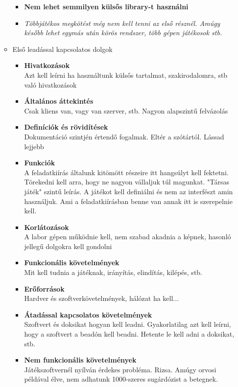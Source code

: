 \documentclass{article}
\begin{document}
\begin{itemize}
\begin{itemize}
\begin{itemize}
				\item \textbf{Nem lehet semmilyen külsős library-t használni}
				\item \textit{Többjátékos megkötést még nem kell tenni az első résznél. Amúgy később lehet egymás után körös rendszer, több gépen játékosok stb.}
			\end{itemize}
			\item Első leadással kapcsolatos dolgok
			\begin{itemize}
				\item \textbf{Hivatkozások}\\
				Azt kell leírni ha használtunk külsős tartalmat, szakirodalomra, stb való hivatkozások
				\item \textbf{Általános áttekintés}\\
				Csak kliens van, vagy van szerver, stb. Nagyon alapszintű felvázolás 
				\item \textbf{Definíciók és rövidítések}\\ 
				Dokumentáció szintjén értendő fogalmak. Eltér a szótártól. Lássad lejjebb
				\item \textbf{Funkciók}\\
				A feladatkiírás általunk kitömött részeire itt hangsúlyt kell fektetni. Törekedni kell arra, hogy ne nagyon vállaljuk túl magunkat. "Társas játék" szintű leírás. A játékot kell definiálni és nem az interfészt amin használjuk. Ami a feladatkiírásban benne van annak itt is szerepelnie kell. 
				\item \textbf{Korlátozások}\\
				A labor gépen működnie kell, nem szabad akadnia a képnek, hasonló jellegű dolgokra kell gondolni
				\item \textbf{Funkcionális követelmények}\\
				Mit kell tudnia a játéknak, irányítás, elindítás, kilépés, stb.
				\item \textbf{Erőforrások}\\
				Hardver és szoftverkövetelmények, hálózat ha kell...
				\item \textbf{Átadással kapcsolatos követelmények}\\
				Szoftvert és doksikat hogyan kell leadni. Gyakorlatilag azt kell leírni, hogy a szoftvert a beadón kell beadni. Hetente le kell adni a doksikat, stb.
				\item \textbf{Nem funkcionális követelmények}\\
				Játékszoftvernél nyílván érdekes probléma. Rizsa. Amúgy orvosi példával élve, nem adhatunk 1000-szeres sugárdózist a betegnek.

\end{itemize}
\end{itemize}
\end{itemize}
\end{document}

